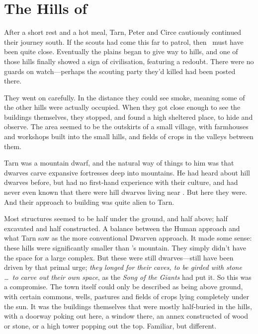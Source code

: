 \chapter{The Hills of \tholkunrond}

After a short rest and a hot meal, Tarn, Peter and Circe cautiously continued their journey south.  If the scouts had come this far to patrol, then \tholkunrond\ must have been quite close.  Eventually the plains began to give way to hills, and one of those hills finally showed a sign of civilisation, featuring a redoubt.  There were no guards on watch---perhaps the scouting party they'd killed had been posted there.

They went on carefully.  In the distance they could see smoke, meaning some of the other hills were actually occupied.  When they got close enough to see the buildings themselves, they stopped, and found a high sheltered place, to hide and observe.  The area seemed to be the outskirts of a small village, with farmhouses and workshops built into the small hills, and fields of crops in the valleys between them.

Tarn was a mountain dwarf, and the natural way of things to him was that dwarves carve expansive fortresses deep into mountains.  He had heard about hill dwarves before, but had no first-hand experience with their culture, and had never even known that there were hill dwarves living near \korbarthrond.  But here they were.  And their approach to building was quite alien to Tarn.

Most structures seemed to be half under the ground, and half above; half excavated and half constructed.  A balance between the Human approach and what Tarn saw as the more conventional Dwarven approach.  It made some sense: these hills were significantly smaller than \korbarthrond's mountain.  They simply didn't have the space for a large complex.  But these were still dwarves---still have been driven by that primal urge; \emph{they longed for their caves, to be girded with stone \ldots\ to carve out their own space}, as the \emph{Song of the Giants} had put it.  So this was a compromise.  The town itself could only be described as being above ground, with certain commons, wells, pastures and fields of crops lying completely under the sun.  It was the buildings themselves that were mostly half-buried in the hills, with a doorway poking out here, a window there, an annex constructed of wood or stone, or a high tower popping out the top.  Familiar, but different.

